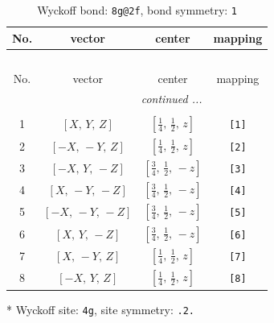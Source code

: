 \documentclass[fleqn,8pt]{jsarticle}
\begin{document}
\begin{longtable}{cccc}
\caption{Wyckoff bond: {\tt 8g@2f}, bond symmetry: {\tt 1}}
 \\
 \hline \hline
No. & vector & center & mapping \\ \hline \endfirsthead

\multicolumn{3}{l}{\tablename\ \thetable{}} \\
 \hline \hline
No. & vector & center & mapping \\ \hline \endhead

 \hline \hline
\multicolumn{3}{r}{\footnotesize\it continued ...} \\ \endfoot

 \hline \hline
\multicolumn{3}{r}{} \\ \endlastfoot

1 & $\left[ X,\, Y,\, Z \right]$ & $\left[ \frac{1}{4},\, \frac{1}{2},\, z \right]$ & {\tt [1]} \\ \hline
2 & $\left[ - X,\, - Y,\, Z \right]$ & $\left[ \frac{1}{4},\, \frac{1}{2},\, z \right]$ & {\tt [2]} \\ \hline
3 & $\left[ - X,\, Y,\, - Z \right]$ & $\left[ \frac{3}{4},\, \frac{1}{2},\, - z \right]$ & {\tt [3]} \\ \hline
4 & $\left[ X,\, - Y,\, - Z \right]$ & $\left[ \frac{3}{4},\, \frac{1}{2},\, - z \right]$ & {\tt [4]} \\ \hline
5 & $\left[ - X,\, - Y,\, - Z \right]$ & $\left[ \frac{3}{4},\, \frac{1}{2},\, - z \right]$ & {\tt [5]} \\ \hline
6 & $\left[ X,\, Y,\, - Z \right]$ & $\left[ \frac{3}{4},\, \frac{1}{2},\, - z \right]$ & {\tt [6]} \\ \hline
7 & $\left[ X,\, - Y,\, Z \right]$ & $\left[ \frac{1}{4},\, \frac{1}{2},\, z \right]$ & {\tt [7]} \\ \hline
8 & $\left[ - X,\, Y,\, Z \right]$ & $\left[ \frac{1}{4},\, \frac{1}{2},\, z \right]$ & {\tt [8]} \\
\end{longtable}
* Wyckoff site: {\tt 4g}, site symmetry: {\tt .2.}
\renewcommand{\arraystretch}{1.2}
\end{document}
